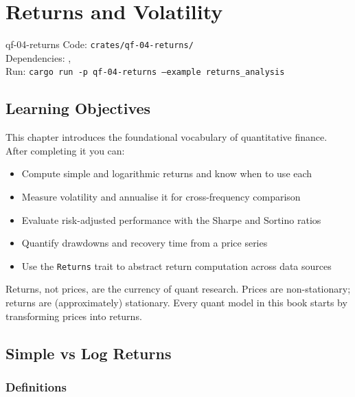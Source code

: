 \chapter{Returns and Volatility}
\label{ch:returns}

\begin{companioncode}{qf-04-returns}
Code: \texttt{crates/qf-04-returns/}\\
Dependencies: , \\
Run: \texttt{cargo run -p qf-04-returns --example returns\_analysis}
\end{companioncode}

\section{Learning Objectives}

This chapter introduces the foundational vocabulary of quantitative finance.
After completing it you can:

\begin{itemize}
    \item Compute simple and logarithmic returns and know when to use each
    \item Measure volatility and annualise it for cross-frequency comparison
    \item Evaluate risk-adjusted performance with the Sharpe and Sortino ratios
    \item Quantify drawdowns and recovery time from a price series
    \item Use the \texttt{Returns} trait to abstract return computation across
      data sources
\end{itemize}

\begin{keyinsight}
Returns, not prices, are the currency of quant research. Prices are
non-stationary; returns are (approximately) stationary. Every quant model in
this book starts by transforming prices into returns.
\end{keyinsight}

\section{Simple vs Log Returns}

\subsection{Definitions}

